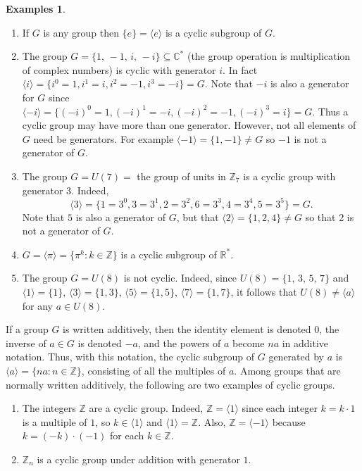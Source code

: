 \documentclass[11pt]{article}
\newcommand{\R}{\mathbb R}
\newcommand{\cm} {{\mathbb C}}
\newcommand{\Z} {{\mathbb Z}}
\newcommand{\units}[1]{\ensuremath{U(#1)}}
\newcommand{\<}{\ensuremath{\langle}}
\renewcommand{\>}{\ensuremath{\rangle}}
\newcommand{\eye}{\ensuremath{e}}
\theoremstyle{plain}
\theoremstyle{definition}
\newtheorem{exs}[thm]{Examples}
\begin{document}
\begin{exs}  \begin{enumerate}
\item If $G$ is any group  then
$\{\eye\} =\langle \eye\rangle$ is a cyclic subgroup of $G$.

\item  The group $G=\{1,\, -1,\, i,\, -i\} \subseteq \cm^*$ (the
group operation  is multiplication of complex numbers) is cyclic
with generator $i$.  In fact $\langle i\rangle = \{i^0=1, i^1=i,
i^2=-1, i^3=-i\} = G$.  Note that $-i$ is also a generator for $G$
since $\langle -i\rangle =\{(-i)^0=1, (-i)^1=-i, (-i)^2=-1,
(-i)^3=i\}=G$.  Thus a cyclic group may have more than one
generator.  However, not all elements of $G$ need be generators.
For example $\langle -1\rangle = \{1, -1\}\ne G$ so $-1$ is not a
generator of $G$.

\item The group $G=\units{7}=$ the group of units in $\Z_7$ is
a cyclic group with generator $3$.  Indeed,
$$\langle 3\rangle = \{ 1=3^0, 3=3^1, 2=3^2, 6=3^3, 4=3^4, 5=3^5\}=G.$$
Note that $5$ is also a generator of $G$, but that
$\langle 2\rangle = \{1, 2, 4\}\ne G$ so that 2 is not a generator of $G$.

\item  $G=\langle \pi\rangle =\{\pi^k:k\in \Z\}$ is a cyclic
subgroup of $\R^*$.

\item  The group $G=\units{8}$ is not cyclic.  Indeed, since
$\units{8}=\{1, \, 3,\, 5,\,7\}$ and $\langle 1\rangle = \{1\}$,
$\langle 3\rangle = \{1, 3\}$, $\langle 5\rangle=\{1, 5\}$,
$\langle 7\rangle =\{1, 7\}$, it follows that $\units{8}\ne \langle
a\rangle$ for any $a\in \units{8}$.
\end{enumerate}
\medskip
If a group $G$ is written additively, then the identity
element is denoted $0$,   the inverse of $a\in G$ is denoted $-a$,
and the powers of $a$ become $na$ in additive notation.  Thus,
with this notation, the cyclic subgroup of $G$ generated by $a$ is
$\langle a \rangle = \{na: n\in \Z\}$, consisting of all the
multiples of $a$. Among groups that are normally written
additively, the following are two examples of cyclic groups.
\begin{enumerate}
\addtocounter{enumi}{5} \item  The integers $\Z$ are a cyclic
group. Indeed, $\Z=\langle 1\rangle$ since each integer $k=k\cdot
1$ is a multiple of $1$, so $k\in \langle 1\rangle$ and $\langle
1\rangle =\Z$.  Also, $\Z=\langle -1\rangle$ because $k=(-k)\cdot
(-1)$ for each $k\in \Z$.

\item  $\Z_n$ is a cyclic group under addition with generator $1$.
\end{enumerate}
\end{exs}
\end{document}
